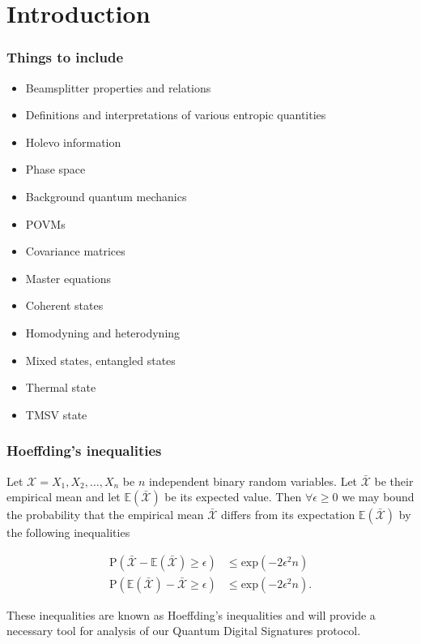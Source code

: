 \chapter{Introduction}

\subsection{Things to include}
\begin{itemize}
\item Beamsplitter properties and relations
\item Definitions and interpretations of various entropic quantities
\item Holevo information
\item Phase space
\item Background quantum mechanics
\item POVMs
\item Covariance matrices
\item Master equations
\item Coherent states
\item Homodyning and heterodyning
\item Mixed states, entangled states
\item Thermal state
\item TMSV state
\end{itemize}

\subsection{Hoeffding's inequalities}
Let $\mathcal{X} = X_1, X_2, \dots, X_n$ be $n$ independent binary random variables. Let $\bar{\mathcal{X}}$ be their empirical mean  and let $\mathbb{E}\left(\bar{\mathcal{X}}\right)$ be its expected value. Then $\forall \epsilon \ge 0$ we may bound the probability that the empirical mean $\bar{\mathcal{X}}$ differs from its expectation $\mathbb{E}\left(\bar{\mathcal{X}}\right)$ by the following inequalities

\begin{align}
\label{eqn:hoeffding1}
\text{P}\left(\bar{\mathcal{X}} - \mathbb{E}\left(\bar{\mathcal{X}}\right) \ge \epsilon\right) &\le \text{exp}\left(- 2 \epsilon^2 n\right) \\
\label{eqn:hoeffding2}
\text{P}\left(\mathbb{E}\left(\bar{\mathcal{X}}\right) - \bar{\mathcal{X}} \ge \epsilon\right) &\le \text{exp}\left(- 2 \epsilon^2 n\right).
\end{align}

\noindent These inequalities are known as Hoeffding's inequalities  and will provide a necessary tool for analysis of our Quantum Digital Signatures protocol.

